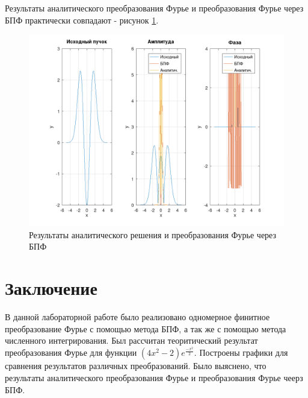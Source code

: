 {\begin{enumerate}
{			Результаты аналитического преобразования Фурье и преобразования Фурье через БПФ практически совпадают - рисунок \ref{full_solution}.
			\begin{figure}[H]
				\includegraphics[width=0.75\pagewidth]{full_solution}
				\caption{Результаты аналитического решения и преобразования Фурье через БПФ}
				\label{full_solution}
			\end{figure}
		}
	\end{enumerate}
}
\newpage

\titleformat{\section}{\large\bfseries\centering}{\thesection}{0.5em}{\MakeUppercase}
\titleformat{\subsection}[block]{\bfseries\hspace{1em}}{\thesubsection}{0.5em}{}

\section*{Заключение}
{
	В данной лабораторной работе было реализовано одномерное финитное преобразование Фурье с помощью метода БПФ, а так же с помощью метода численного интегрирования. Был рассчитан теоритический результат преобразования Фурье для функции $(4 x^2 - 2) e^{\frac{-x^2}{2}}$. Построены графики для сравнения результатов различных преобразований. Было выяснено, что результаты аналитического преобразования Фурье и преобразования Фурье чеерз БПФ.
}
\newpage

